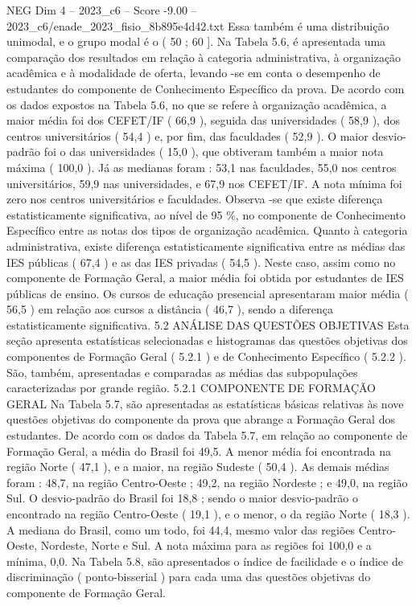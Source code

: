 \begin{textsample}{NEG Dim 4 – 2023\_c6 – Score -9.00 – 2023\_c6/enade\_2023\_fisio\_8b895e4d42.txt}
Essa também é uma distribuição unimodal, e o grupo modal é o ( 50 ; 60 ].
Na Tabela 5.6, é apresentada uma comparação dos resultados em relação à categoria administrativa, à organização acadêmica e à modalidade de oferta, levando -se em conta o desempenho de estudantes do componente de Conhecimento Específico da prova.
De acordo com os dados expostos na Tabela 5.6, no que se refere à organização acadêmica, a maior média foi dos CEFET/IF ( 66,9 ), seguida das universidades ( 58,9 ), dos centros universitários ( 54,4 ) e, por fim, das faculdades ( 52,9 ).
O maior desvio-padrão foi o das universidades ( 15,0 ), que obtiveram também a maior nota máxima ( 100,0 ).
Já as medianas foram : 53,1 nas faculdades, 55,0 nos centros universitários, 59,9 nas universidades, e 67,9 nos CEFET/IF.
A nota mínima foi zero nos centros universitários e faculdades.
Observa -se que existe diferença estatisticamente significativa, ao nível de 95 \%, no componente de Conhecimento Específico entre as notas dos tipos de organização acadêmica.
Quanto à categoria administrativa, existe diferença estatisticamente significativa entre as médias das IES públicas ( 67,4 ) e as das IES privadas ( 54,5 ).
Neste caso, assim como no componente de Formação Geral, a maior média foi obtida por estudantes de IES públicas de ensino.
Os cursos de educação presencial apresentaram maior média ( 56,5 ) em relação aos cursos a distância ( 46,7 ), sendo a diferença estatisticamente significativa. 5.2 ANÁLISE DAS QUESTÕES OBJETIVAS Esta seção apresenta estatísticas selecionadas e histogramas das questões objetivas dos componentes de Formação Geral ( 5.2.1 ) e de Conhecimento Específico ( 5.2.2 ).
São, também, apresentadas e comparadas as médias das subpopulações caracterizadas por grande região. 5.2.1 COMPONENTE DE FORMAÇÃO GERAL Na Tabela 5.7, são apresentadas as estatísticas básicas relativas às nove questões objetivas do componente da prova que abrange a Formação Geral dos estudantes.
De acordo com os dados da Tabela 5.7, em relação ao componente de Formação Geral, a média do Brasil foi 49,5.
A menor média foi encontrada na região Norte ( 47,1 ), e a maior, na região Sudeste ( 50,4 ).
As demais médias foram : 48,7, na região Centro-Oeste ; 49,2, na região Nordeste ; e 49,0, na região Sul.
O desvio-padrão do Brasil foi 18,8 ; sendo o maior desvio-padrão o encontrado na região Centro-Oeste ( 19,1 ), e o menor, o da região Norte ( 18,3 ).
A mediana do Brasil, como um todo, foi 44,4, mesmo valor das regiões Centro-Oeste, Nordeste, Norte e Sul.
A nota máxima para as regiões foi 100,0 e a mínima, 0,0.
Na Tabela 5.8, são apresentados o índice de facilidade e o índice de discriminação ( ponto-bisserial ) para cada uma das questões objetivas do componente de Formação Geral.

\end{textsample}
